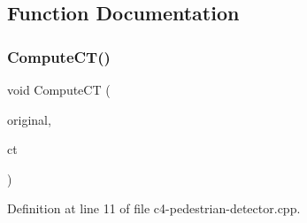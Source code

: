 \subsection{Function Documentation}
\mbox{\label{c4-pedestrian-detector_8cpp_a205804b2ee8558313222a898513a9543}} 
\subsubsection{\texorpdfstring{Compute\+C\+T()}{ComputeCT()}}
{\footnotesize\ttfamily void Compute\+CT (\begin{DoxyParamCaption}\item[{\mbox{\hyperlink{class_int_image}{Int\+Image}}$<$ double $>$ \&}]{original,  }\item[{\mbox{\hyperlink{class_int_image}{Int\+Image}}$<$ int $>$ \&}]{ct }\end{DoxyParamCaption})}



Definition at line 11 of file c4-\/pedestrian-\/detector.\+cpp.


